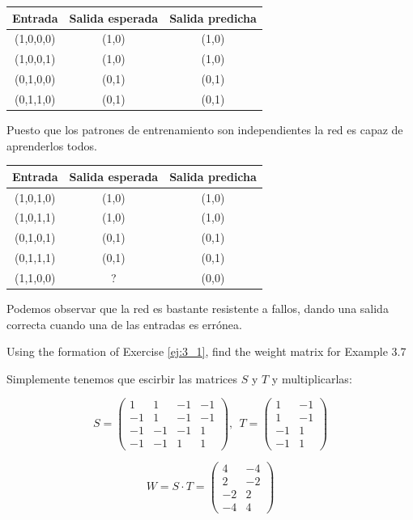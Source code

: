 \begin{problem}[6]
\spart

\begin{center}
\begin{tabular}{|c|c|c|}
\hline
\textbf{Entrada } & \textbf{Salida esperada} & \textbf{Salida predicha} \\
\hline
(1,0,0,0) & (1,0) & (1,0) \\
(1,0,0,1) & (1,0) & (1,0) \\
(0,1,0,0) & (0,1) & (0,1) \\
(0,1,1,0) & (0,1) & (0,1) \\
\hline
\end{tabular}
\end{center}

Puesto que los patrones de entrenamiento son independientes la red es capaz de aprenderlos todos.

\spart

\begin{center}
\begin{tabular}{|c|c|c|}
\hline
\textbf{Entrada } & \textbf{Salida esperada} & \textbf{Salida predicha} \\
\hline
(1,0,1,0) & (1,0) & (1,0) \\
(1,0,1,1) & (1,0) & (1,0) \\
(0,1,0,1) & (0,1) & (0,1) \\
(0,1,1,1) & (0,1) & (0,1) \\
(1,1,0,0) & ? & (0,0) \\
\hline
\end{tabular}
\end{center}

Podemos observar que la red es bastante resistente a fallos, dando una salida correcta cuando una de las entradas es errónea.
\end{problem}

\begin{problem}[7]
Using the formation of Exercise \ref{ej:3_1}, find the weight matrix for Example 3.7
\solution


Simplemente tenemos que escirbir las matrices $S$ y $T$ y multiplicarlas:

\[S = \left( \begin{array}{cccc}
1  & 1  & -1 & -1 \\
-1 & 1  & -1 & -1 \\
-1 & -1 & -1 & 1 \\
-1 & -1 & 1  & 1
\end{array}\right), \ \ T = \left( \begin{array}{cc}
1  & -1 \\
1  & -1 \\
-1 & 1 \\
-1 & 1
\end{array}\right)\]

\[W = S\cdot T = \left( \begin{array}{cc}
4 & -4 \\
2 & -2 \\
-2 & 2 \\
-4 & 4
\end{array}\right)\]

\end{problem}


